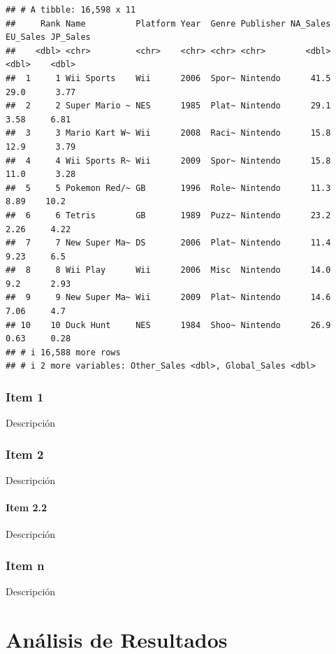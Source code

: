 \documentclass[oneside,11pt]{Latex/Classes/PhDthesisPSnPDF}
\begin{document}
\begin{verbatim}
## # A tibble: 16,598 x 11
##     Rank Name          Platform Year  Genre Publisher NA_Sales EU_Sales JP_Sales
##    <dbl> <chr>         <chr>    <chr> <chr> <chr>        <dbl>    <dbl>    <dbl>
##  1     1 Wii Sports    Wii      2006  Spor~ Nintendo      41.5    29.0      3.77
##  2     2 Super Mario ~ NES      1985  Plat~ Nintendo      29.1     3.58     6.81
##  3     3 Mario Kart W~ Wii      2008  Raci~ Nintendo      15.8    12.9      3.79
##  4     4 Wii Sports R~ Wii      2009  Spor~ Nintendo      15.8    11.0      3.28
##  5     5 Pokemon Red/~ GB       1996  Role~ Nintendo      11.3     8.89    10.2 
##  6     6 Tetris        GB       1989  Puzz~ Nintendo      23.2     2.26     4.22
##  7     7 New Super Ma~ DS       2006  Plat~ Nintendo      11.4     9.23     6.5 
##  8     8 Wii Play      Wii      2006  Misc  Nintendo      14.0     9.2      2.93
##  9     9 New Super Ma~ Wii      2009  Plat~ Nintendo      14.6     7.06     4.7 
## 10    10 Duck Hunt     NES      1984  Shoo~ Nintendo      26.9     0.63     0.28
## # i 16,588 more rows
## # i 2 more variables: Other_Sales <dbl>, Global_Sales <dbl>
\end{verbatim}

\subsection{Item 1}

Descripción\\

\subsection{Item 2}

Descripción\\

\subsubsection{Item 2.2}

Descripción\\

\subsection{Item n}

Descripción\\

\chapter{Análisis de Resultados}
\end{document}
